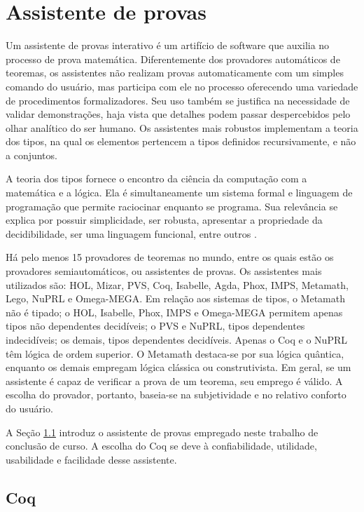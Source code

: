\chapter{Assistente de provas}
\label{cap:provas}

Um assistente de provas interativo é um artifício de software que auxilia no processo de prova matemática. Diferentemente dos provadores automáticos de teoremas, os assistentes não realizam provas automaticamente com um simples comando do usuário, mas participa com ele no processo oferecendo uma variedade de procedimentos formalizadores. Seu uso também se justifica na necessidade de validar demonstrações, haja vista que detalhes podem passar despercebidos pelo olhar analítico do ser humano. Os assistentes mais robustos implementam a teoria dos tipos, na qual os elementos pertencem a tipos definidos recursivamente, e não a conjuntos.

A teoria dos tipos fornece o encontro da ciência da computação com a matemática e a lógica. Ela é simultaneamente um sistema formal e linguagem de programação que permite raciocinar enquanto se programa. Sua relevância se explica por possuir simplicidade, ser robusta, apresentar a propriedade da decidibilidade, ser uma linguagem funcional, entre outros \cite{luo}.

Há pelo menos 15 provadores de teoremas no mundo, entre os quais estão os provadores semiautomáticos, ou assistentes de provas. Os assistentes mais utilizados são: HOL, Mizar, PVS, Coq, Isabelle, Agda, Phox, IMPS, Metamath, Lego, NuPRL e Omega-MEGA. Em relação aos sistemas de tipos, o Metamath não é tipado; o HOL, Isabelle, Phox, IMPS e Omega-MEGA permitem apenas tipos não dependentes decidíveis; o PVS e NuPRL, tipos dependentes indecidíveis; os demais, tipos dependentes decidíveis. Apenas o Coq e o NuPRL têm lógica de ordem superior. O Metamath destaca-se por sua lógica quântica, enquanto os demais empregam lógica clássica ou construtivista. Em geral, se um assistente é capaz de verificar a prova de um teorema, seu emprego é válido. A escolha do provador, portanto, baseia-se na subjetividade e no relativo conforto do usuário.

A Seção \ref{sec:coq} introduz o assistente de provas empregado neste trabalho de conclusão de curso. A escolha do Coq se deve à confiabilidade, utilidade, usabilidade e facilidade desse assistente.

\section{Coq}
\label{sec:coq}

